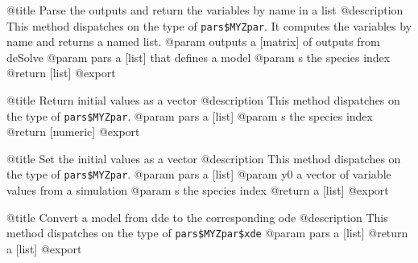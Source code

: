 \documentclass[
]{article}
\newenvironment{Shaded}{\begin{snugshade}}{\end{snugshade}}
\newcommand{\ControlFlowTok}[1]{\textcolor[rgb]{0.13,0.29,0.53}{\textbf{#1}}}
\newcommand{\FunctionTok}[1]{\textcolor[rgb]{0.13,0.29,0.53}{\textbf{#1}}}
\newcommand{\NormalTok}[1]{#1}
\newcommand{\OtherTok}[1]{\textcolor[rgb]{0.56,0.35,0.01}{#1}}
\newcommand{\SpecialCharTok}[1]{\textcolor[rgb]{0.81,0.36,0.00}{\textbf{#1}}}
\newcommand{\StringTok}[1]{\textcolor[rgb]{0.31,0.60,0.02}{#1}}
\begin{document}
@title Parse the outputs and return the variables by name in a list
@description This method dispatches on the type of
\texttt{pars\$MYZpar}. It computes the variables by name and returns a
named list. @param outputs a {[}matrix{]} of outputs from deSolve @param
pars a {[}list{]} that defines a model @param s the species index
@return {[}list{]} @export

\begin{Shaded}
\end{Shaded}

@title Return initial values as a vector @description This method
dispatches on the type of \texttt{pars\$MYZpar}. @param pars a
{[}list{]} @param s the species index @return {[}numeric{]} @export

\begin{Shaded}
\end{Shaded}

@title Set the initial values as a vector @description This method
dispatches on the type of \texttt{pars\$MYZpar}. @param pars a
{[}list{]} @param y0 a vector of variable values from a simulation
@param s the species index @return a {[}list{]} @export

\begin{Shaded}
\end{Shaded}

@title Convert a model from dde to the corresponding ode @description
This method dispatches on the type of \texttt{pars\$MYZpar\$xde} @param
pars a {[}list{]} @return a {[}list{]} @export
\end{document}
